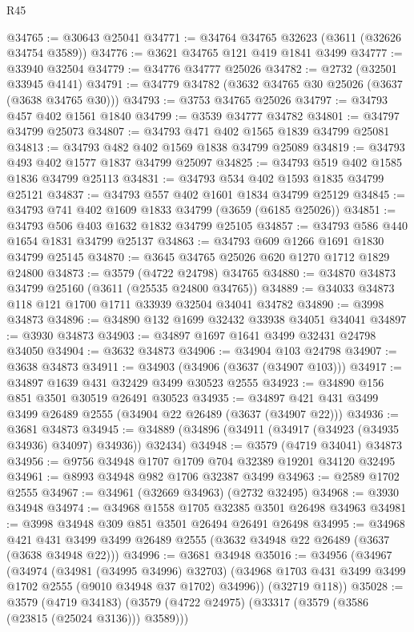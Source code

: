\begin{lexlean}{R45}
\begin{coremodule}
@34765 := @30643 @25041
@34771 := @34764 @34765 @32623 (@3611 (@32626 @34754 @3589))
@34776 := @3621 @34765 @121 @419 @1841 @3499
@34777 := @33940 @32504
@34779 := @34776 @34777 @25026
@34782 := @2732 (@32501 @33945 @4141)
@34791 := @34779 @34782 (@3632 @34765 @30 @25026 (@3637 (@3638 @34765 @30)))
@34793 := @3753 @34765 @25026
@34797 := @34793 @457 @402 @1561 @1840
@34799 := @3539 @34777 @34782
@34801 := @34797 @34799 @25073
@34807 := @34793 @471 @402 @1565 @1839 @34799 @25081
@34813 := @34793 @482 @402 @1569 @1838 @34799 @25089
@34819 := @34793 @493 @402 @1577 @1837 @34799 @25097
@34825 := @34793 @519 @402 @1585 @1836 @34799 @25113
@34831 := @34793 @534 @402 @1593 @1835 @34799 @25121
@34837 := @34793 @557 @402 @1601 @1834 @34799 @25129
@34845 := @34793 @741 @402 @1609 @1833 @34799 (@3659 (@6185 @25026))
@34851 := @34793 @506 @403 @1632 @1832 @34799 @25105
@34857 := @34793 @586 @440 @1654 @1831 @34799 @25137
@34863 := @34793 @609 @1266 @1691 @1830 @34799 @25145
@34870 := @3645 @34765 @25026 @620 @1270 @1712 @1829 @24800
@34873 := @3579 (@4722 @24798) @34765
@34880 := @34870 @34873 @34799 @25160 (@3611 (@25535 @24800 @34765))
@34889 := @34033 @34873 @118 @121 @1700 @1711 @33939 @32504 @34041 @34782
@34890 := @3998 @34873
@34896 := @34890 @132 @1699 @32432 @33938 @34051 @34041
@34897 := @3930 @34873
@34903 := @34897 @1697 @1641 @3499 @32431 @24798 @34050
@34904 := @3632 @34873
@34906 := @34904 @103 @24798
@34907 := @3638 @34873
@34911 := @34903 (@34906 (@3637 (@34907 @103)))
@34917 := @34897 @1639 @431 @32429 @3499 @30523 @2555
@34923 := @34890 @156 @851 @3501 @30519 @26491 @30523
@34935 := @34897 @421 @431 @3499 @3499 @26489 @2555 (@34904 @22 @26489 (@3637 (@34907 @22)))
@34936 := @3681 @34873
@34945 := @34889 (@34896 (@34911 (@34917 (@34923 (@34935 @34936) @34097) @34936)) @32434)
@34948 := @3579 (@4719 @34041) @34873
@34956 := @9756 @34948 @1707 @1709 @704 @32389 @19201 @34120 @32495
@34961 := @8993 @34948 @982 @1706 @32387 @3499
@34963 := @2589 @1702 @2555
@34967 := @34961 (@32669 @34963) (@2732 @32495)
@34968 := @3930 @34948
@34974 := @34968 @1558 @1705 @32385 @3501 @26498 @34963
@34981 := @3998 @34948 @309 @851 @3501 @26494 @26491 @26498
@34995 := @34968
    @421
    @431
    @3499
    @3499
    @26489
    @2555
    (@3632 @34948 @22 @26489 (@3637 (@3638 @34948 @22)))
@34996 := @3681 @34948
@35016 := @34956
    (@34967
      (@34974
        (@34981 (@34995 @34996) @32703)
        (@34968 @1703 @431 @3499 @3499 @1702 @2555 (@9010 @34948 @37 @1702) @34996))
      (@32719 @118))
@35028 := @3579
    (@4719 @34183)
    (@3579 (@4722 @24975) (@33317 (@3579 (@3586 (@23815 (@25024 @3136))) @3589)))

\end{coremodule}
\end{lexlean}
